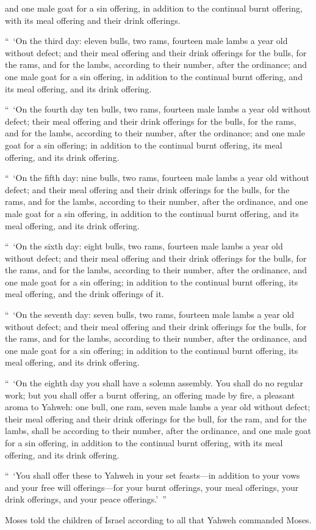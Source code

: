 {and one male goat for a sin offering, in addition to the continual burnt offering, with its meal offering and their drink offerings.
\par }{\PP {}“ ‘On the third day: eleven bulls, two rams, fourteen male lambs a year old without defect;
and their meal offering and their drink offerings for the bulls, for the rams, and for the lambs, according to their number, after the ordinance;
and one male goat for a sin offering, in addition to the continual burnt offering, and its meal offering, and its drink offering.
\par }{\PP {}“ ‘On the fourth day ten bulls, two rams, fourteen male lambs a year old without defect;
their meal offering and their drink offerings for the bulls, for the rams, and for the lambs, according to their number, after the ordinance;
and one male goat for a sin offering; in addition to the continual burnt offering, its meal offering, and its drink offering.
\par }{\PP {}“ ‘On the fifth day: nine bulls, two rams, fourteen male lambs a year old without defect;
and their meal offering and their drink offerings for the bulls, for the rams, and for the lambs, according to their number, after the ordinance,
and one male goat for a sin offering, in addition to the continual burnt offering, and its meal offering, and its drink offering.
\par }{\PP {}“ ‘On the sixth day: eight bulls, two rams, fourteen male lambs a year old without defect;
and their meal offering and their drink offerings for the bulls, for the rams, and for the lambs, according to their number, after the ordinance,
and one male goat for a sin offering; in addition to the continual burnt offering, its meal offering, and the drink offerings of it.
\par }{\PP {}“ ‘On the seventh day: seven bulls, two rams, fourteen male lambs a year old without defect;
and their meal offering and their drink offerings for the bulls, for the rams, and for the lambs, according to their number, after the ordinance,
and one male goat for a sin offering; in addition to the continual burnt offering, its meal offering, and its drink offering.
\par }{\PP {}“ ‘On the eighth day you shall have a solemn assembly. You shall do no regular work;
but you shall offer a burnt offering, an offering made by fire, a pleasant aroma to Yahweh: one bull, one ram, seven male lambs a year old without defect;
their meal offering and their drink offerings for the bull, for the ram, and for the lambs, shall be according to their number, after the ordinance,
and one male goat for a sin offering, in addition to the continual burnt offering, with its meal offering, and its drink offering.
\par }{\PP {}“ ‘You shall offer these to Yahweh in your set feasts—in addition to your vows and your free will offerings—for your burnt offerings, your meal offerings, your drink offerings, and your peace offerings.’ ”
\par }{\PP {}Moses told the children of Israel according to all that Yahweh commanded Moses.

}
